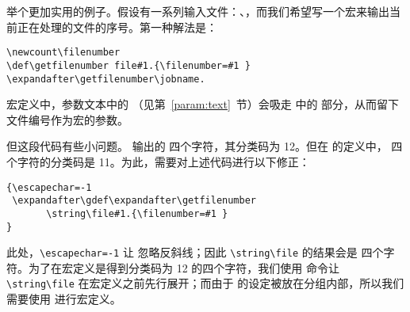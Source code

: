 \documentclass{book}
\begin{document}
举个更加实用的例子。假设有一系列输入文件：、\label{ex:jobnumber}，而我们希望写一个宏来输出当前正在处理的文件的序号。第一种解法是：
\begin{verbatim}
\newcount\filenumber
\def\getfilenumber file#1.{\filenumber=#1 }
\expandafter\getfilenumber\jobname.
\end{verbatim}
宏定义中，参数文本中的 （见第~\ref{param:text}~节）会吸走  中的  部分，从而留下文件编号作为宏的参数。

但这段代码有些小问题。 输出的  四个字符，其分类码为 12。但在  的定义中， 四个字符的分类码是 11。为此，需要对上述代码进行以下修正：
\begin{verbatim}
{\escapechar=-1
 \expandafter\gdef\expandafter\getfilenumber
       \string\file#1.{\filenumber=#1 }
}
\end{verbatim}
此处，\verb>\escapechar=-1> 让  忽略反斜线；因此 \verb>\string\file> 的结果会是  四个字符。为了在宏定义是得到分类码为 12 的四个字符，我们使用  命令让 \verb>\string\file> 在宏定义之前先行展开；而由于  的设定被放在分组内部，所以我们需要使用  进行宏定义。
\end{document}
